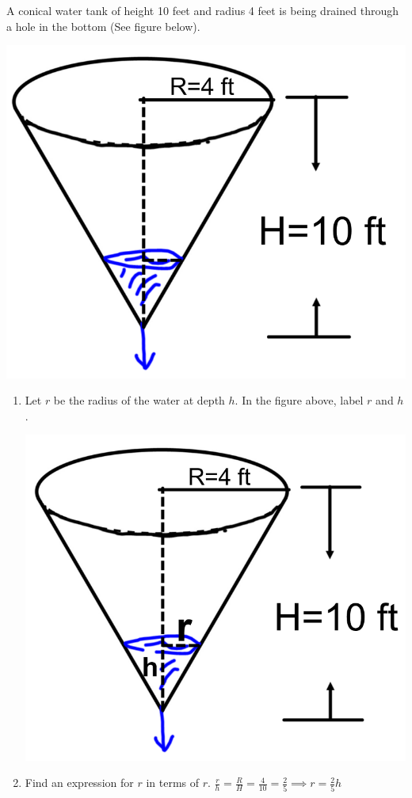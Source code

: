 \documentclass[nooutcomes]{ximera}
\begin{document}
\begin{problem}
A conical water tank of height 10 feet and radius 4 feet is being drained through a hole in the bottom (See figure below).   
		\begin{image}
		\includegraphics[scale=.4]{Figure14.png}
		\end{image}

\begin{enumerate}
	\item Let $r$ be the radius of the water at depth $h$.  In the figure above, label $r$ and $h$.
		\begin{freeResponse} \hfil
		\begin{image}
		\includegraphics[scale=.4]{Figure15.png}
		\end{image}
		\end{freeResponse}	
	\item Find an expression for $r$ in terms of $r$.
	$\frac{r}{h}=\frac{R}{H}=\frac{4}{10}=\frac{2}{5} \implies r=\frac{2}{5}h$
	

\end{enumerate}
\end{problem}
\end{document}
